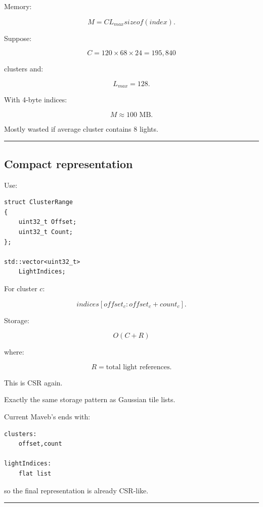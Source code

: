 Memory:

\[
M=
C
L_{max}
sizeof(index).
\]

Suppose:

\[
C=120\times68\times24
=
195,840
\]

clusters and:

\[
L_{max}=128.
\]

With 4-byte indices:

\[
M\approx100\text{ MB}.
\]

Mostly wasted if average cluster contains 8 lights.

\begin{center}\rule{0.5\linewidth}{0.5pt}\end{center}

\subsection{Compact representation}\label{04-visual-computing-ii-ch040-compact-representation}

\hypertarget{04-visual-computing-ii-ch040-compact-representation}{}

Use:

\begin{verbatim}
struct ClusterRange
{
    uint32_t Offset;
    uint32_t Count;
};

std::vector<uint32_t>
    LightIndices;
\end{verbatim}

For cluster \(c\):

\[
indices[
offset_c:
offset_c+count_c
].
\]

Storage:

\[
O(C+R)
\]

where:

\[
R=
\text{total light references}.
\]

This is CSR again.

Exactly the same storage pattern as Gaussian tile lists.

Current Maveb's  ends with:

\begin{verbatim}
clusters:
    offset,count

lightIndices:
    flat list
\end{verbatim}

so the final representation is already CSR-like.

\begin{center}\rule{0.5\linewidth}{0.5pt}\end{center}

